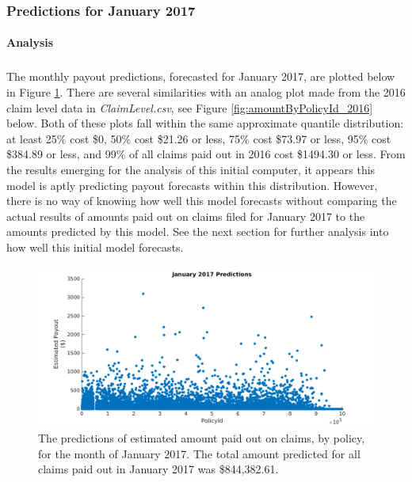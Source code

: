 \documentclass[12pt,letterpaper,titlepage]{article}
\begin{document}
			\subsubsection{Predictions for January 2017}				
			\paragraph*{Analysis} 
			\subparagraph*{}The monthly payout predictions, forecasted for January 2017, are plotted below in Figure \ref{fig:jan17PredScat}. There are several similarities with an analog plot made from the 2016 claim level data in \emph{ClaimLevel.csv}, see Figure \ref{fig:amountByPolicyId_2016} below. Both of these plots fall within the same approximate quantile distribution: at least 25\% cost \$0,  50\% cost \$21.26 or less, 75\% cost \$73.97 or less, 95\% cost \$384.89 or less, and 99\% of all claims paid out in 2016 cost \$1494.30 or less. From the results emerging for the analysis of this initial computer, it appears this model is aptly predicting payout forecasts within this distribution. However, there is no way of knowing how well this model forecasts without comparing the actual results of amounts paid out on claims filed for January 2017 to the amounts predicted by this model. See the next section for further analysis into how well this initial model forecasts.
			
			\begin{figure}[!ht]
				\centering
				\includegraphics[scale=0.45]{jan17predictions.png}
				\caption{The predictions of estimated amount paid out on claims, by policy, for the month of January 2017. The total amount predicted for all claims paid out in January 2017 was \$844,382.61.
} 
				\label{fig:jan17PredScat}
			\end{figure}
			\FloatBarrier
			
\end{document}
